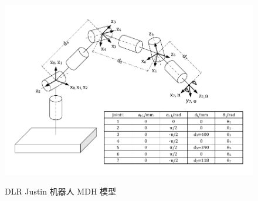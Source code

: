 \documentclass[cn,11pt,chinese,blue,bibstyle=ieeetr]{elegantbook}
\begin{document}
\begin{figure}[htbp]
	\centering
	\includegraphics[scale=1]{images//dlr_justin_mdh.pdf} \\
	\caption{DLR Justin 机器人 MDH 模型}
	\label{justin_mdh_model}
\end{figure}
\end{document}

